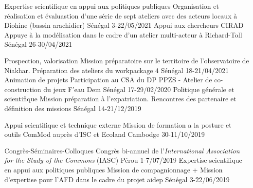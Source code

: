 

\begin{cvhonors}


    \cvhonor
      {Expertise scientifique en appui aux politiques publiques} %
      {Organisation et réalisation et évaluastion d'une série de sept ateliers avec des acteurs locaux à Diohine (bassin arachidier) } %
      {Sénégal} %
      {3-22/05/2021} %
    \cvhonor
      {Appui aux chercheurs CIRAD} %
      {Appuye à la modélisation dans le cadre d'un atelier multi-acteur à Richard-Toll} %
      {Sénégal} %
      {26-30/04/2021} %

    \cvhonor
      {Prospection, valorisation} %
      {Mission préparatoire sur le territoire de l'observatoire de Niakhar. Préparation des ateliers du workpackage 4} %
      {Sénégal} %
      {18-21/04/2021} %
    \cvhonor
      {Animation de projets} %
      {Participation au CSA du DP PPZS - Atelier de co-construction du jeux F'eau Dem} %
      {Sénégal} %
      {17-29/02/2020} %
    \cvhonor
      {Politique générale et scientifique} %
      {Mission préparation à l'expatriation. Rencontres des partenaire et définition des missions} %
      {Sénégal} %
      {14-21/12/2019} %

    \cvhonor
      {Appui scientifique et technique externe } %
      {Mission de formation a la posture et outils ComMod auprès d'ISC et Ecoland} %
      {Cambodge} %
      {30-11/10/2019} %

    \cvhonor
      {Congrès-Séminaires-Colloques} %
      {Congrès bi-annuel de l'\textit{International Association for the Study of the Commons} (IASC)} %
      {Pérou} %
      {1-7/07/2019} %
    \cvhonor
      {Expertise scientifique en appui aux politiques publiques} %
      {Mission de compagnionnage + Mission d'expertise pour l'AFD dans le cadre du projet aidep} %
      {Sénégal} %
      {3-22/06/2019} %


\end{cvhonors}
